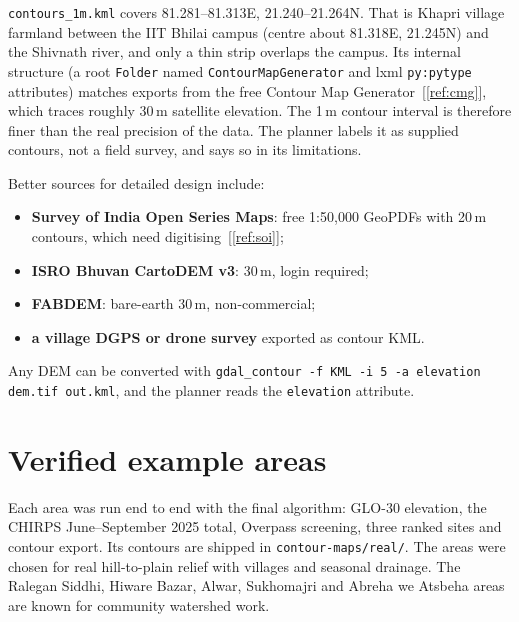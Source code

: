 \documentclass[11pt,a4paper]{article}
\newcommand{\code}[1]{\texttt{#1}}
\begin{document}
\begin{warnbox}[title=Provenance of the supplied contour map]
\code{contours\_1m.kml} covers 81.281--81.313\textdegree E, 21.240--21.264\textdegree N. That is Khapri village farmland between the IIT Bhilai campus (centre about 81.318\textdegree E, 21.245\textdegree N) and the Shivnath river, and only a thin strip overlaps the campus. Its internal structure (a root \code{Folder} named \code{ContourMapGenerator} and lxml \code{py:pytype} attributes) matches exports from the free Contour Map Generator~[\ref{ref:cmg}], which traces roughly 30\,m satellite elevation. The 1\,m contour interval is therefore finer than the real precision of the data. The planner labels it as supplied contours, not a field survey, and says so in its limitations.
\end{warnbox}

Better sources for detailed design include:
\begin{itemize}
\item \textbf{Survey of India Open Series Maps}: free 1:50,000 GeoPDFs with 20\,m contours, which need digitising~[\ref{ref:soi}];
\item \textbf{ISRO Bhuvan CartoDEM v3}: 30\,m, login required;
\item \textbf{FABDEM}: bare-earth 30\,m, non-commercial;
\item \textbf{a village DGPS or drone survey} exported as contour KML.
\end{itemize}
Any DEM can be converted with \code{gdal\_contour -f KML -i 5 -a elevation dem.tif out.kml}, and the planner reads the \code{elevation} attribute.

\section{Verified example areas}
\label{sec:examples}
Each area was run end to end with the final algorithm: GLO-30 elevation, the CHIRPS June--September 2025 total, Overpass screening, three ranked sites and contour export. Its contours are shipped in \code{contour-maps/real/}. The areas were chosen for real hill-to-plain relief with villages and seasonal drainage. The Ralegan Siddhi, Hiware Bazar, Alwar, Sukhomajri and Abreha we Atsbeha areas are known for community watershed work.
\end{document}
